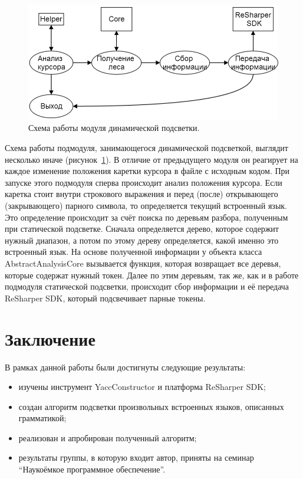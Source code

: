 \begin{figure}[t]
\centering
\includegraphics[width=\linewidth]{Ivanov/Pictures/dynamicHighlighting.png}
\caption{Схема работы модуля динамической подсветки.}
\label{dynamicHighlighting}
\end{figure}

Схема работы подмодуля, занимающегося динамической подсветкой, выглядит несколько иначе (рисунок~\ref{dynamicHighlighting}). В отличие от предыдущего модуля он реагирует на каждое изменение положения каретки курсора в файле с исходным кодом. При запуске этого подмодуля сперва происходит анализ положения курсора. Если каретка стоит внутри строкового выражения и перед (после) открывающего (закрывающего) парного символа, то определяется текущий встроенный язык. Это определение происходит за счёт поиска по деревьям разбора, полученным при статической подсветке. Сначала определяется дерево, которое содержит нужный диапазон, а потом по этому дереву определяется, какой именно это встроенный язык. На основе полученной информации у объекта класса AbstractAnalysisCore вызывается функция, которая возвращает все деревья, которые содержат нужный токен. Далее по этим деревьям, так же, как и в работе подмодуля статической подсветки, происходит сбор информации и её передача ReSharper SDK, который подсвечивает парные токены. 

\section*{Заключение}

В рамках данной работы были достигнуты следующие результаты:
\begin{itemize}
\item изучены инструмент YaccConstructor и платформа ReSharper SDK;
\item создан алгоритм подсветки произвольных встроенных языков, описанных грамматикой;
\item реализован и апробирован полученный алгоритм;
\item результаты группы, в которую входит автор, приняты на семинар ``Наукоёмкое программное обеспечение''.
\end{itemize}

